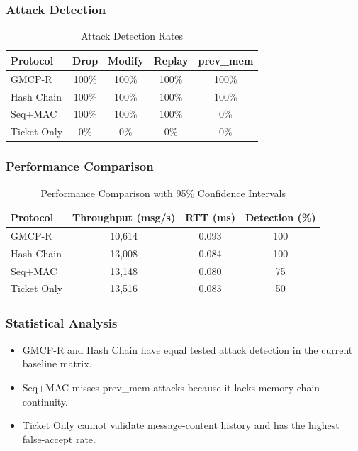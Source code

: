 \documentclass[conference]{IEEEtran}
\begin{document}
\subsubsection{Attack Detection}

\begin{table}[t]
\centering
\caption{Attack Detection Rates}
\begin{tabular}{lcccc}
\toprule
Protocol & Drop & Modify & Replay & prev\_mem \\
\midrule
GMCP-R & 100\% & 100\% & 100\% & 100\% \\
Hash Chain & 100\% & 100\% & 100\% & 100\% \\
Seq+MAC & 100\% & 100\% & 100\% & 0\% \\
Ticket Only & 0\% & 0\% & 0\% & 0\% \\
\bottomrule
\end{tabular}
\label{tab:detection_rates}
\end{table}

\subsubsection{Performance Comparison}

\begin{table}[t]
\centering
\caption{Performance Comparison with 95\% Confidence Intervals}
\begin{tabular}{lccc}
\toprule
Protocol & Throughput (msg/s) & RTT (ms) & Detection (\%) \\
\midrule
GMCP-R & 10,614 & 0.093 & 100 \\
Hash Chain & 13,008 & 0.084 & 100 \\
Seq+MAC & 13,148 & 0.080 & 75 \\
Ticket Only & 13,516 & 0.083 & 50 \\
\bottomrule
\end{tabular}
\label{tab:performance}
\end{table}

\subsubsection{Statistical Analysis}


\begin{itemize}
\item GMCP-R and Hash Chain have equal tested attack detection in the current baseline matrix.
\item Seq+MAC misses prev\_mem attacks because it lacks memory-chain continuity.
\item Ticket Only cannot validate message-content history and has the highest false-accept rate.
\end{itemize}
\end{document}
